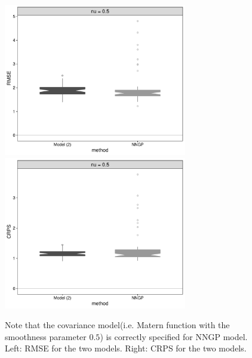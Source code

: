 \documentclass[
12pt, %
a4paper, %
oneside, %
headinclude,footinclude, %
BCOR5mm, %
]{scrartcl}
\begin{document}
  \begin{figure}[H]
    \includegraphics[width= 8cm]{./Figures/simuRMSE_1}
     \includegraphics[width= 8cm]{./Figures/simuCRPS_1}\\
      \caption{Note that the covariance model(i.e. Matern function with the smoothness parameter $0.5$) is correctly specified for NNGP model. Left: RMSE for the two models. Right: CRPS for the two models.}
      \label{fgr:simulat1}
    \end{figure}
\end{document}
